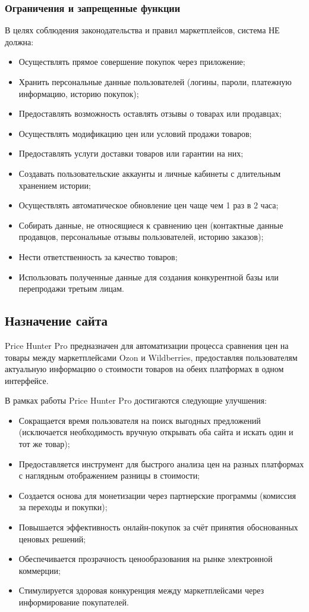 \documentclass[a4paper,12pt]{article}
\begin{document}
\subsubsection{Ограничения и запрещенные функции}
В целях соблюдения законодательства и правил маркетплейсов, система НЕ должна:
\begin{itemize}
    \item Осуществлять прямое совершение покупок через приложение;
    \item Хранить персональные данные пользователей (логины, пароли, платежную информацию, историю покупок);
    \item Предоставлять возможность оставлять отзывы о товарах или продавцах;
    \item Осуществлять модификацию цен или условий продажи товаров;
    \item Предоставлять услуги доставки товаров или гарантии на них;
    \item Создавать пользовательские аккаунты и личные кабинеты с длительным хранением истории;
    \item Осуществлять автоматическое обновление цен чаще чем 1 раз в 2 часа;
    \item Собирать данные, не относящиеся к сравнению цен (контактные данные продавцов, персональные отзывы пользователей, историю заказов);
    \item Нести ответственность за качество товаров;
    \item Использовать полученные данные для создания конкурентной базы или перепродажи третьим лицам.
\end{itemize}

\subsection{Назначение сайта}
Price Hunter Pro предназначен для автоматизации процесса сравнения цен на товары между маркетплейсами Ozon и Wildberries, предоставляя пользователям актуальную информацию о стоимости товаров на обеих платформах в одном интерфейсе.

В рамках работы Price Hunter Pro достигаются следующие улучшения:
\begin{itemize}
    \item Сокращается время пользователя на поиск выгодных предложений (исключается необходимость вручную открывать оба сайта и искать один и тот же товар);
    \item Предоставляется инструмент для быстрого анализа цен на разных платформах с наглядным отображением разницы в стоимости;
    \item Создается основа для монетизации через партнерские программы (комиссия за переходы и покупки);
    \item Повышается эффективность онлайн-покупок за счёт принятия обоснованных ценовых решений;
    \item Обеспечивается прозрачность ценообразования на рынке электронной коммерции;
    \item Стимулируется здоровая конкуренция между маркетплейсами через информирование покупателей.
\end{itemize}
\newpage
\end{document}

